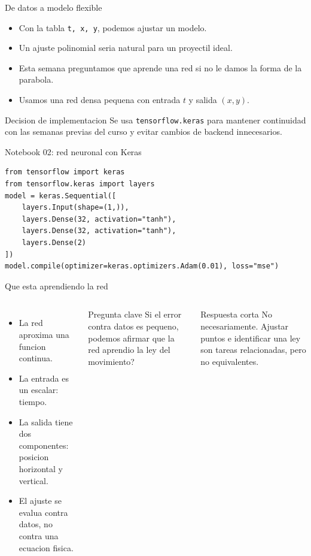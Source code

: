 \begin{frame}{De datos a modelo flexible}
\begin{itemize}
    \item Con la tabla \texttt{t, x, y}, podemos ajustar un modelo.
    \item Un ajuste polinomial seria natural para un proyectil ideal.
    \item Esta semana preguntamos que aprende una red si no le damos la forma de la parabola.
    \item Usamos una red densa pequena con entrada $t$ y salida $(x,y)$.
\end{itemize}
\begin{alertblock}{Decision de implementacion}
Se usa \texttt{tensorflow.keras} para mantener continuidad con las semanas previas del curso y evitar cambios de backend innecesarios.
\end{alertblock}
\end{frame}

\begin{frame}[fragile]{Notebook 02: red neuronal con Keras}
\begin{verbatim}
from tensorflow import keras
from tensorflow.keras import layers
model = keras.Sequential([
    layers.Input(shape=(1,)),
    layers.Dense(32, activation="tanh"),
    layers.Dense(32, activation="tanh"),
    layers.Dense(2)
])
model.compile(optimizer=keras.optimizers.Adam(0.01), loss="mse")
\end{verbatim}
\end{frame}

\begin{frame}{Que esta aprendiendo la red}
\begin{columns}[T,onlytextwidth]
\begin{itemize}
    \item La red aproxima una funcion continua.
    \item La entrada es un escalar: tiempo.
    \item La salida tiene dos componentes: posicion horizontal y vertical.
    \item El ajuste se evalua contra datos, no contra una ecuacion fisica.
\end{itemize}
\begin{block}{Pregunta clave}
Si el error contra datos es pequeno, podemos afirmar que la red aprendio la ley del movimiento?
\end{block}
\begin{alertblock}{Respuesta corta}
No necesariamente. Ajustar puntos e identificar una ley son tareas relacionadas, pero no equivalentes.
\end{alertblock}
\end{columns}
\end{frame}

